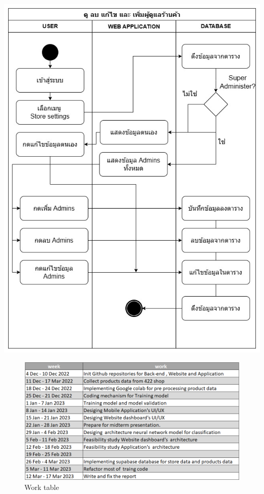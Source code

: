 \begin{center}
    \includegraphics[scale=0.25]{pic/diagram/ad-web5.jpg}\\

    \begin{figure}[h]
        \begin{center}

            \includegraphics[scale=0.5]{pic/work_plane.png}
        \end{center}

        \caption[Work table]{Work table}
        \label{fig:Work table}
    \end{figure}



\end{center}

